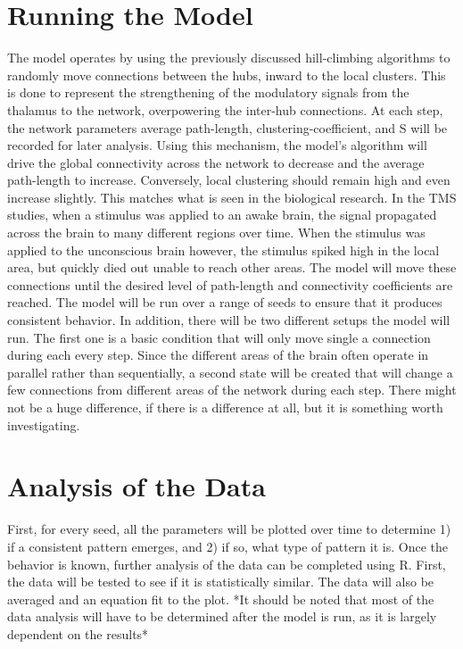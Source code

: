 \documentclass[12pt,letterpaper]{report}
\begin{document}
\section{Running the Model}
	The model operates by using the previously discussed hill-climbing algorithms to randomly move connections between the hubs, inward to the local clusters. This is done to represent the strengthening of the modulatory signals from the thalamus to the network, overpowering the inter-hub connections.  At each step, the network parameters average path-length, clustering-coefficient, and S will be recorded for later analysis. Using this mechanism, the model's algorithm will drive the global connectivity across the network to decrease and the average path-length to increase. Conversely, local clustering should remain high and even increase slightly. This matches what is seen in the biological research. In the TMS studies, when a stimulus was applied to an awake brain, the signal propagated across the brain to many different regions over time. When the stimulus was applied to the unconscious brain however, the stimulus spiked high in the local area, but quickly died out unable to reach other areas. The model will move these connections until the desired level of path-length and connectivity coefficients are reached. 
	The model will be run over a range of seeds to ensure that it produces consistent behavior. In addition, there will be two different setups the model will run. The first one is a basic condition that will only move single a connection during each every step. Since the different areas of the brain often operate in parallel rather than sequentially, a second state will be created that will change a few connections from different areas of the network during each step. There might not be a huge difference, if there is a difference at all, but it is something worth investigating.
\section{Analysis of the Data}
	First, for every seed, all the parameters will be plotted over time to determine 1) if a  consistent pattern emerges, and 2) if so, what type of pattern it is. Once the behavior is known, further analysis of the data can be completed using R. First, the data will be tested to see if it is statistically similar. The data will also be averaged and an equation fit to the plot. 
	*It should be noted that most of the data analysis will have to be determined after the model is run, as it is largely dependent on the  results*
\end{document}
